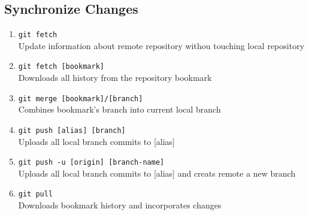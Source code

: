 \documentclass[a4paper, twoside, 8pt]{extarticle}
\newenvironment{enumx} {
	\begin{enumerate}[leftmargin=*]
	\setlength{\topsep}{0pt}
	\setlength{\itemsep}{0pt}
	\setlength{\parskip}{0pt}
	\setlength{\parsep}{0pt}
	}
{\end{enumerate}}
\begin{document}
\begin{multicols}{3}
\subsection{Synchronize Changes}
\begin{enumx}
	\item \texttt{git fetch}\\
	Update information about remote repository withou touching local repository
    \item \texttt{git fetch [bookmark]}\\
    Downloads all history from the repository bookmark
    \item \texttt{git merge [bookmark]/[branch]}\\
    Combines bookmark’s branch into current local branch
    \item \texttt{git push [alias] [branch]}\\
    Uploads all local branch commits to [alias]
    \item \texttt{git push -u [origin] [branch-name]}\\
    Uploads all local branch commits to [alias] and creats remote a new branch
    \item \texttt{git pull}\\
    Downloads bookmark history and incorporates changes
\end{enumx}
\end{multicols}
\end{document}
